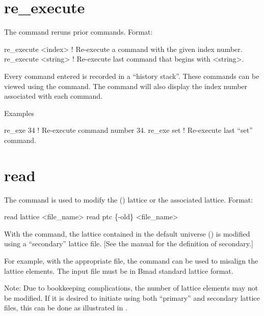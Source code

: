 \section{re_execute}
\label{s:re.exe}

The  command reruns prior commands.  Format:
\begin{example}
  re_execute <index>   ! Re-execute a command with the given index number.
  re_execute <string>  ! Re-execute last command that begins with <string>.
\end{example}

\vskip 10pt 
Every \tao command entered is recorded in a ``history stack''. These
commands can be viewed using the  command. The 
command will also display the index number associated with each command.

Examples
\begin{example}
  re_exe 34   ! Re-execute command number 34.
  re_exe set  ! Re-execute last ``set'' command.  
\end{example}

\section{read}
\label{s:read}

The  command is used to modify the (\bmad)  lattice or the associated
 lattice.  Format:
\begin{example}
  read lattice <file_name>
  read ptc \{-old\} <file_name>
\end{example}

\vskip 10pt 

With the  command, the  lattice contained in the default
universe () is modified using a ``secondary'' lattice file.  [See the
\bmad manual for the definition of secondary.]

For example, with the appropriate file, the  command can be used to misalign the
lattice elements. The input file must be in Bmad standard lattice format.

Note: Due to bookkeeping complications, the number of lattice elements may not be
modified. If it is desired to initiate \tao using both ``primary'' and secondary lattice
files, this can be done as illustrated in .

